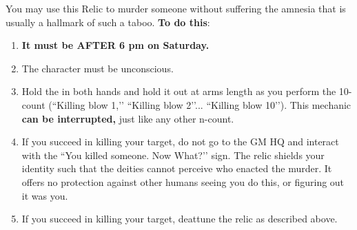 \documentclass[green]{GL2020}
\begin{document}
You may use this Relic to murder someone without suffering the amnesia that is usually a hallmark of such a taboo. \textbf{To do this}:
\begin{enumerate}
  \item \textbf{It must be AFTER 6 pm on Saturday.}
  \item The character must be unconscious.
  \item Hold the \iScythe{} in both hands and hold it out at arms length as you perform the 10-count (``Killing blow 1,’’ ``Killing blow 2’’... ``Killing blow 10’’). This mechanic \textbf{can be interrupted,} just like any other n-count.
  \item If you succeed in killing your target, do not go to the GM HQ and interact with the ``You killed someone. Now What?’’ sign. The relic shields your identity such that the deities cannot perceive who enacted the murder. It offers no protection against other humans seeing you do this, or figuring out it was you.
  \item If you succeed in killing your target, deattune the relic as described above.
\end{enumerate}
\end{document}
